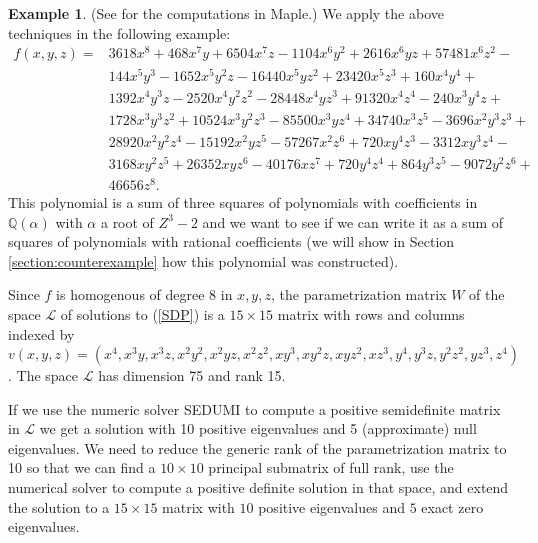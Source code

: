 \documentclass{amsart}
\theoremstyle{definition}
\newtheorem{example}[theorem]{Example}
\theoremstyle{remark}
\numberwithin{equation}{section}
\newcommand{\eLL}{{\mathcal L}}
\newcommand{\Q}{{\mathbb Q}}
\begin{document}
\begin{example}
\label{exampleB}
(See \cite[Worksheet B]{rationalSOS} for the computations in Maple.)
We apply the above techniques in the following example:
\[
\begin{aligned}
f(x,y,z) = {} & 3618x^8+468x^7y+6504x^7z-1104x^6y^2+2616x^6yz+57481x^6z^2- \\
& 144x^5y^3-1652x^5y^2z-16440x^5yz^2+23420x^5z^3+160x^4y^4+ \\
& 1392x^4y^3z-2520x^4y^2z^2- 28448x^4yz^3+91320x^4z^4-240x^3y^4z+ \\
& 1728x^3y^3z^2+10524x^3y^2z^3-85500x^3yz^4+34740x^3z^5-3696x^2y^3z^3+ \\
& 28920x^2y^2z^4- 15192x^2yz^5-57267x^2z^6+720xy^4z^3-3312xy^3z^4- \\
& 3168xy^2z^5+ 26352xyz^6-40176xz^7+720y^4z^4+864y^3z^5-9072y^2z^6+ \\
& 46656z^8.
\end{aligned}
\]
This polynomial is a sum of three squares of polynomials with coefficients in $\Q(\alpha)$ with $\alpha$ a root of $Z^3-2$ and we want to see if we can write it as a sum of squares of polynomials with rational coefficients (we will show in Section \ref{section:counterexample} how this polynomial was constructed).

Since $f$ is homogenous of degree $8$ in $x, y, z$, the parametrization matrix $W$ of the space $\eLL$ of solutions to (\ref{SDP}) is a $15 \times 15$ matrix with rows and columns indexed by $v(x,y,z) = (x^4, x^3y, x^3z, x^2y^2, x^2yz,  x^2z^2,  xy^3, xy^2z, \allowbreak xyz^2, xz^3, \allowbreak y^4, y^3z, \allowbreak y^2z^2, yz^3, z^4)$. The space $\eLL$ has dimension 75 and rank 15.

If we use the numeric solver SEDUMI to compute a positive semidefinite matrix in $\eLL$ we get a solution with 10 positive eigenvalues and 5 (approximate) null eigenvalues. We need to reduce the generic rank of the parametrization matrix to 10 so that we can find a $10 \times 10$ principal submatrix of full rank, use the numerical solver to compute a positive definite solution in that space, and extend the solution to a $15 \times 15$ matrix with $10$ positive eigenvalues and $5$ exact zero eigenvalues.


\end{example}
\end{document}
